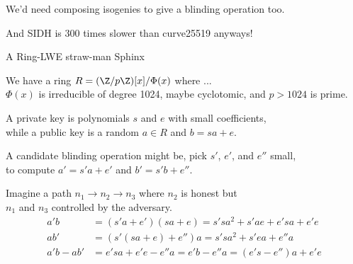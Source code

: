 \smallskip


We'd need composing isogenies to give a blinding operation too. 

\smallskip

And SIDH is 300 times slower than curve25519 anyways!










\begin{frame}{A Ring-LWE straw-man Sphinx}

We have a ring $R = (\Z/p\Z)[x]/\Phi(x)$ where ... \\
\hspace*{3pt} $\Phi(x)$ is irreducible of degree 1024, maybe cyclotomic,
 and $p>1024$ is prime. 
\smallskip

A private key is polynomials $s$ and $e$ with small coefficients, \\
\hspace*{3pt} while a public key is a random $a\in R$ and $b = s a + e$.

\pause\smallskip
A candidate blinding operation might be, pick $s'$, $e'$, and $e''$ small, \\
\hspace*{3pt} to compute $a' = s' a + e'$ and $b' = s' b + e''$.

\smallskip
Imagine a path $n_1 \to n_2 \to n_3$ where $n_2$ is honest but \\
\hspace*{3pt}  $n_1$ and $n_3$ controlled by the adversary.
\begin{align*}
a' b &= (s' a + e') (s a + e) = s' s a^2 + s' a e + e' s a + e' e \\
a b' &= (s' (s a + e) + e'')a = s' s a^2 + s' e a + e'' a \\
a' b - a b' &= e' s a + e' e - e'' a
= e' b - e'' a
= (e' s - e'') a + e' e
\end{align*}

\end{frame}





